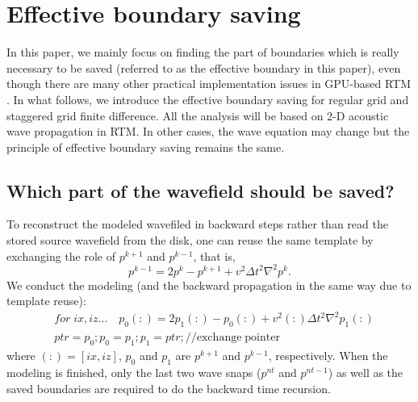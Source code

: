 \section{Effective boundary saving}

In this paper, we mainly focus on finding the part of boundaries which is really necessary to be saved (referred to as the effective boundary in this paper), even though there are many other practical implementation issues in GPU-based RTM \citep{liu2012issues}.  In what follows, we introduce the effective boundary saving for regular grid and staggered grid finite difference. All the analysis will be based on 2-D acoustic wave propagation in RTM. In other cases, the wave equation may change but the principle of effective boundary saving remains the same.

\subsection{Which part of the wavefield should be saved?}

To reconstruct the modeled wavefiled in backward steps rather than read the stored source wavefield from the disk, one can reuse the same template by exchanging the role of $p^{k+1}$ and $p^{k-1}$, that is,
\begin{equation}\label{eq:forward2}
p^{k-1}=2p^{k}-p^{k+1}+v^2\Delta t^2 \nabla^2 p^{k}.
\end{equation}
We conduct the modeling (and the backward propagation in the same way due to template reuse):
\begin{displaymath}
\begin{split}
 &for\;ix,iz... \quad p_0(:)=2p_1(:)-p_0(:)+v^2(:)\Delta t^2 \nabla^2 p_1(:)\\
 &ptr=p_0;p_0=p_1;p_1=ptr;// \mathrm{exchange\; pointer}
\end{split}
\end{displaymath}
where $(:)=[ix,iz]$, $p_0$ and $p_1$ are $p^{k+1}$ and $p^{k-1}$, respectively. When the modeling is finished, only the last two wave snaps ($p^{nt}$ and $p^{nt-1}$) as well as the saved boundaries are required to do the backward time recursion.


